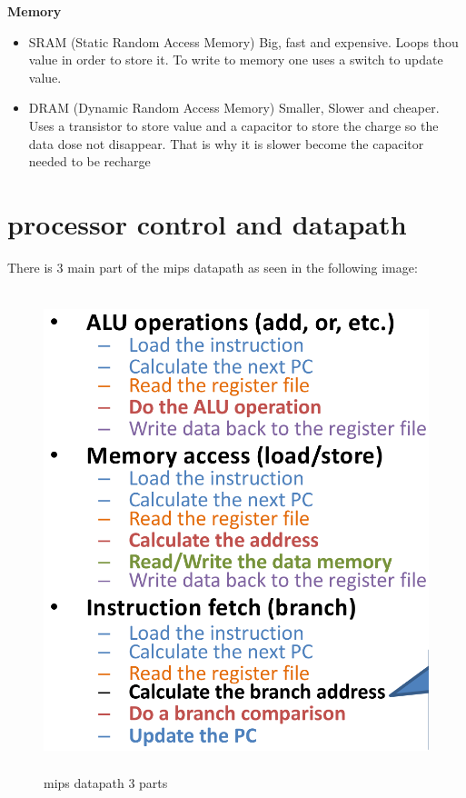 \textbf{Memory}
\begin{itemize}
\item  SRAM (Static Random Access Memory) Big, fast and expensive. Loops thou value in order to store it.
  To write to memory one uses a switch to update value.
\item  DRAM (Dynamic Random Access Memory) Smaller, Slower and cheaper. Uses a transistor to store value
  and a capacitor to store the charge so the data dose not disappear.
  That is why it is slower become the capacitor needed to be recharge
\end{itemize}


\newpage


\section{processor control and datapath}
There is 3 main part of the mips datapath as seen in the following image:
\begin{figure}[h]
    \vspace{10mm}
    \centering
    \includegraphics[width=12cm, height=14cm]{image/mips-datapath-3parts.png} 
    \caption{mips datapath 3 parts}
    \label{mips-datapath-3parts}
\end{figure}

